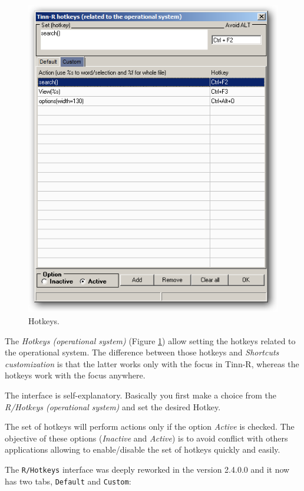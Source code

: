 \begin{figure}[h!]
  \includegraphics[scale=0.35]{./res/hotkeys_custom.png}
  \caption{Hotkeys.}
  \label{fig:hotkeys}
\end{figure}

The \textit{Hotkeys (operational system)}
(Figure \ref{fig:hotkeys})
allow setting the hotkeys
related to the operational system. The difference between those hotkeys and
\textit{Shortcuts customization} is that the latter works only with the
focus in Tinn-R, whereas the hotkeys work with the focus anywhere.

The interface is self-explanatory. Basically you first make a choice from
the \textit{R/Hotkeys (operational system)} and set the desired Hotkey.

The set of hotkeys will perform actions only if the option \textit{Active}
is checked. The objective of these options (\textit{Inactive} and
\textit{Active}) is to avoid conflict with others applications allowing
to enable/disable the set of hotkeys quickly and easily.

The \texttt{R/Hotkeys} interface was deeply reworked in the version 2.4.0.0 and it now has two tabs,
\texttt{Default} and \texttt{Custom}:

